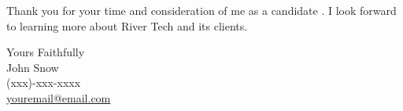 \documentclass[11pt,a4]{article}
\begin{document}
Thank you for your time and consideration of me as a candidate . I look forward to learning more about River Tech and its clients.





\vspace{0.5cm}
\raggedright
Yours Faithfully \\ John Snow \\ (xxx)-xxx-xxxx \\ \href{mailto:youremail@email.com}{youremail@email.com}
\end{document}
